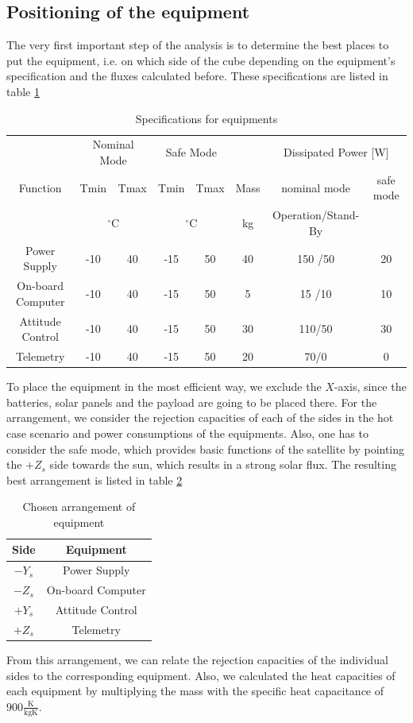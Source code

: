 \subsection{Positioning of the equipment}
The very first important step of the analysis is to determine the best places to put the equipment, i.e. on which side of the cube depending on the equipment's specification and the fluxes calculated before. These specifications are listed in table \ref{tab:equipmentspecification}

\begin{table}[h!]
\centering
\begin{tabular}{ | c| c|c|c|c|c|c|c| }
\hline 
&  \multicolumn{2}{|c|}{Nominal Mode} &  \multicolumn{2}{|c|}{Safe Mode} & & \multicolumn{2}{|c|}{Dissipated Power [W] }\\
Function & Tmin & Tmax & Tmin & Tmax & Mass & nominal mode & safe mode  \\
& \multicolumn{2}{|c|}{$^{\circ}$C} & \multicolumn{2}{|c|}{$^{\circ}$C} & kg &Operation/Stand-By &  \\  \hline

Power Supply &-10   & 40  & -15&50  & 40  &  150 /50 & 20  \\ \hline
On-board Computer &-10  & 40 &-15 &50 &5 &15 /10& 10 \\ \hline
Attitude Control &-10  &40 & -15& 50&30 &110/50 &30  \\ \hline
Telemetry &-10  &40 &-15 &50 &20 &70/0 & 0  \\ \hline
\end{tabular}
\caption{Specifications for equipments}
\label{tab:equipmentspecification}
\end{table}

To place the equipment in the most efficient way, we exclude the $X$-axis, since the batteries, solar panels and the payload are going to be placed there. For the arrangement, we consider the rejection capacities of each of the sides in the hot case scenario and power consumptions of the equipments. Also, one has to consider the safe mode, which provides basic functions of the satellite by pointing the +$Z_{s}$ side towards the sun, which results in a strong solar flux. The resulting best arrangement is listed in table \ref{tab:arrangement}

\begin{table}[H]
\centering
\begin{tabular}{ | c| c|}
\hline 
Side & Equipment  \\ \hline
$-Y_{s}$ & Power Supply  \\ \hline
$-Z_{s}$ &On-board Computer \\\hline
$+Y_{s}$ &Attitude Control \\ \hline
$+Z_{s}$ &Telemetry   \\ \hline
\end{tabular}
\caption{Chosen arrangement of equipment}
\label{tab:arrangement}
\end{table}
From this arrangement, we can relate the rejection capacities of the individual sides to the corresponding equipment. Also, we calculated the heat capacities of each equipment by multiplying the mass with the specific heat capacitance of $900\frac{\mathrm{K}}{\mathrm{kgK}}$.


